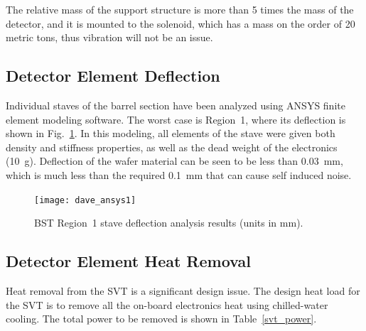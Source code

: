 The relative mass of the support structure is more than 5 times the mass of 
the detector, and it is mounted to the solenoid, which has a mass on the order 
of 20 metric tons, thus vibration will not be an issue.

\subsection{Detector Element Deflection}

Individual staves of the barrel section have been analyzed using ANSYS 
finite element modeling software.  The worst case is Region~1, where its 
deflection is shown in Fig.~\ref{r1_deflect}.  In this modeling, all elements 
of the stave were given both density and stiffness properties, as well as the
dead weight of the electronics (10~g). Deflection of the wafer material can 
be seen to be less than 0.03~mm, which is much less than the required 0.1~mm 
that can cause self induced noise.

\begin{figure}[htbp]
\centering
\texttt{[image: dave\_ansys1]}
\caption{\small{BST Region~1 stave deflection analysis results (units
in mm).}}
\label{r1_deflect}
\end{figure}

\subsection{Detector Element Heat Removal}

Heat removal from the SVT is a significant design issue. The design heat 
load for the SVT is to remove all the on-board electronics heat using 
chilled-water cooling. The total power to be removed is shown in 
Table~\ref{svt_power}.

